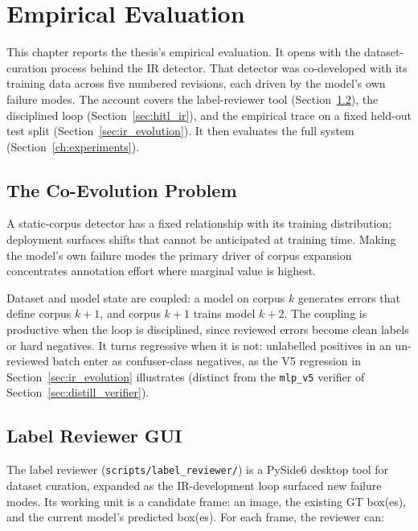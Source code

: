 \chapter{Empirical Evaluation}
\label{ch:hitl}

This chapter reports the thesis's empirical evaluation. It opens with the dataset-curation process behind the IR detector. That detector was co-developed with its training data across five numbered revisions, each driven by the model's own failure modes. The account covers the label-reviewer tool (Section~\ref{sec:label_reviewer}), the disciplined loop (Section~\ref{sec:hitl_ir}), and the empirical trace on a fixed held-out test split (Section~\ref{sec:ir_evolution}). It then evaluates the full system (Section~\ref{ch:experiments}).

\section{The Co-Evolution Problem}
\label{sec:coevolution}

A static-corpus detector has a fixed relationship with its training distribution; deployment surfaces shifts that cannot be anticipated at training time. Making the model's own failure modes the primary driver of corpus expansion concentrates annotation effort where marginal value is highest.

Dataset and model state are coupled: a model on corpus $k$ generates errors that define corpus $k+1$, and corpus $k+1$ trains model $k+2$. The coupling is productive when the loop is disciplined, since reviewed errors become clean labels or hard negatives. It turns regressive when it is not: unlabelled positives in an un-reviewed batch enter as confuser-class negatives, as the V5 regression in Section~\ref{sec:ir_evolution} illustrates (distinct from the \texttt{mlp\_v5} verifier of Section~\ref{sec:distill_verifier}).

\section{Label Reviewer GUI}
\label{sec:label_reviewer}

The label reviewer (\texttt{scripts/label\_reviewer/}) is a PySide6 desktop tool for dataset curation, expanded as the IR-development loop surfaced new failure modes. Its working unit is a candidate frame: an image, the existing GT box(es), and the current model's predicted box(es). For each frame, the reviewer can:

